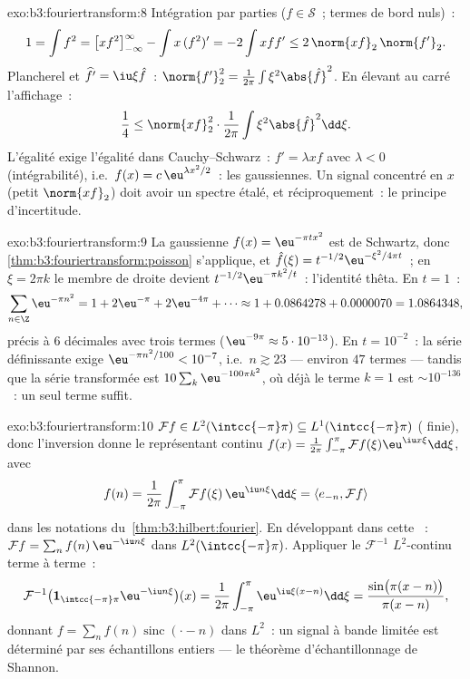 \begin{solution}{exo:b3:fouriertransform:8}
Intégration par parties ($f \in \mathcal S$~; termes de bord
nuls)~:
\[
1 = \int f^2 = \bigl[xf^2\bigr]_{-\infty}^{\infty} - \int
x\,(f^2)' = -2\int xff' \leq 2\,\norm{xf}_2\,\norm{f'}_2 .
\]
Plancherel et $\widehat{f'} = \iu\xi\hat f$~:
$\norm{f'}_2^2 = \frac1{2\pi}\int\xi^2\abs{\hat f}^2$. En
élevant au carré l'affichage~:
\[
\frac14 \leq \norm{xf}_2^2\cdot\frac1{2\pi}
\int\xi^2\abs{\hat f}^2\dd\xi .
\]
L'égalité exige l'égalité dans Cauchy--Schwarz~: $f' =
\lambda xf$ avec $\lambda < 0$ (intégrabilité), i.e.\ $f(x) =
c\,\eu^{\lambda x^2/2}$~: les gaussiennes. Un signal
concentré en $x$ (petit $\norm{xf}_2$) doit avoir un spectre
étalé, et réciproquement~: le principe d'incertitude.
\end{solution}

\begin{solution}{exo:b3:fouriertransform:9}
La gaussienne $f(x) = \eu^{-\pi tx^2}$ est de Schwartz, donc
\cref{thm:b3:fouriertransform:poisson} s'applique, et
$\hat f(\xi) = t^{-1/2}\eu^{-\xi^2/4\pi t}$~; en $\xi = 2\pi
k$ le membre de droite devient $t^{-1/2}\eu^{-\pi k^2/t}$~:
l'identité thêta. En $t = 1$~:
\[
\sum_{n\in\Z}\eu^{-\pi n^2} = 1 + 2\eu^{-\pi} + 2\eu^{-4\pi} +
\cdots \approx 1 + 0.0864278 + 0.0000070 = 1.0864348,
\]
précis à $6$ décimales avec trois termes ($\eu^{-9\pi}
\approx 5\cdot10^{-13}$). En $t = 10^{-2}$~: la série
définissante exige $\eu^{-\pi n^2/100} < 10^{-7}$, i.e.\ $n
\gtrsim 23$ --- environ $47$ termes --- tandis que la série
transformée est $10\sum_k\eu^{-100\pi k^2}$, où déjà le terme
$k = 1$ est $\sim 10^{-136}$~: un seul terme suffit.
\end{solution}

\begin{solution}{exo:b3:fouriertransform:10}
$\mathcal Ff \in L^2(\intcc{-\pi}\pi) \subseteq
L^1(\intcc{-\pi}\pi)$ ( finie), donc l'inversion donne
le représentant continu $f(x) =
\frac1{2\pi}\int_{-\pi}^\pi\mathcal Ff(\xi)\eu^{\iu
x\xi}\dd\xi$, avec
\[
f(n) = \frac1{2\pi}\int_{-\pi}^{\pi}\mathcal
Ff(\xi)\,\eu^{\iu n\xi}\dd\xi = \langle e_{-n}, \mathcal
Ff\rangle
\]
dans les notations du~\cref{thm:b3:hilbert:fourier}. En
développant dans cette ~: $\mathcal Ff =
\sum_nf(n)\,\eu^{-\iu n\xi}$ dans $L^2(\intcc{-\pi}\pi)$.
Appliquer le $\mathcal F^{-1}$ $L^2$-continu terme à terme~:
\[
\mathcal F^{-1}\bigl(\mathbf
1_{\intcc{-\pi}\pi}\eu^{-\iu n\xi}\bigr)(x)
= \frac1{2\pi}\int_{-\pi}^{\pi}\eu^{\iu\xi(x - n)}\dd\xi
= \frac{\sin\bigl(\pi(x-n)\bigr)}{\pi(x - n)} ,
\]
donnant $f = \sum_nf(n)\operatorname{sinc}(\cdot - n)$ dans
$L^2$~: un signal à bande limitée est déterminé par ses
échantillons entiers --- le théorème d'échantillonnage de
Shannon.
\end{solution}

